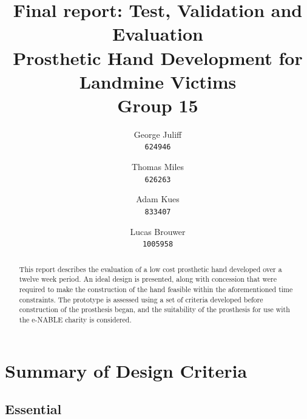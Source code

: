 \documentclass[11pt,3p]{report}
\begin{document}
\pagestyle{fancy}
\lhead{}

\title{
	\huge Final report: Test, Validation and Evaluation \\
	\small Prosthetic Hand Development for Landmine Victims \\
	\vspace{0.5cm}
	\vspace{1cm}
	\large Group 15
}

\author{
	George Juliff\\
	\texttt{624946}
	\and
	Thomas Miles\\
	\texttt{626263}
	\and
	Adam Kues\\
	\texttt{833407}
	\and
	Lucas Brouwer\\
	\texttt{1005958}
}


\maketitle
\vspace{2cm}

\begin{abstract}
This report describes the evaluation of a low cost prosthetic hand developed over a twelve week period. An ideal design is presented, along with concession that were required to make the construction of the hand feasible within the aforementioned time constraints. The prototype is assessed using a set of criteria developed before construction of the prosthesis began, and the suitability of the prosthesis for use with the e-NABLE charity is considered. 
\end{abstract}

\pagebreak


\section{Summary of Design Criteria}
	\subsection{Essential}	\label{ess}
	
\end{document}
